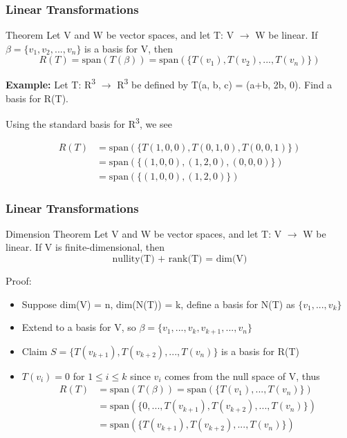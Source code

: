 \documentclass[11pt]{beamer}
\begin{document}
\begin{frame}
	\frametitle{Linear Transformations}
	\begin{block}{Theorem}
		Let V and W be vector spaces, and let T: V $\rightarrow$ W be linear. If $\beta = \{v_{1}, v_{2}, ..., v_{n}\}$ is a basis for V, then
		\[ R(T) = \text{span}(T(\beta)) = \text{span}(\{T(v_{1}), T(v_{2}), ..., T(v_{n})\}) \]
	\end{block}

\textbf{Example:} Let T: R\textsuperscript{3} $\rightarrow$ R\textsuperscript{3} be defined by T(a, b, c) = (a+b, 2b, 0). Find a basis for R(T). \\

\phantom{}

Using the standard basis for R\textsuperscript{3}, we see

	\begin{align*}
		R(T) &= \text{span}(\{ T(1,0,0), T(0,1,0), T(0,0,1) \}) \\
			&= \text{span}(\{(1,0,0), (1,2,0), (0,0,0) \}) \\
			&= \text{span}(\{(1,0,0), (1,2,0) \})
	\end{align*}
\end{frame}

\begin{frame}
	\frametitle{Linear Transformations}
	\begin{block}{Dimension Theorem}
		Let V and W be vector spaces, and let T: V $\rightarrow$ W be linear. If V is \alert{finite-dimensional}, then
		\[\text{nullity(T) + rank(T) = dim(V)} \]
	\end{block}

Proof:
\begin{itemize}
	[default]
	\item Suppose dim(V) = n, dim(N(T)) = k, define a basis for N(T) as $\{v_{1}, ..., v_{k}\}$
	\item Extend to a basis for V, so $\beta = \{v_{1}, ..., v_{k}, v_{k+1}, ..., v_{n} \}$ 
	\item Claim $S = \{T(v_{k+1}),  T(v_{k+2}), ..., T(v_{n})\}$ is a basis for R(T)
	\item $T(v_{i}) = 0$ for $1 \leq i \leq k$ since $v_{i}$ comes from the null space of V, thus
		\begin{align*}
			R(T) &= \text{span}(T(\beta)) = \text{span}(\{T(v_{1}), ..., T(v_{n})\}) \\
			&= \text{span}( \{ 0, ..., T(v_{k+1}), T(v_{k+2}), ..., T(v_{n}) \} ) \\
			&= \text{span}( 
			\{ T(v_{k+1}), T(v_{k+2}), ... , T(v_{n}) \} )
		\end{align*}
\end{itemize}
\end{frame}
\end{document}
